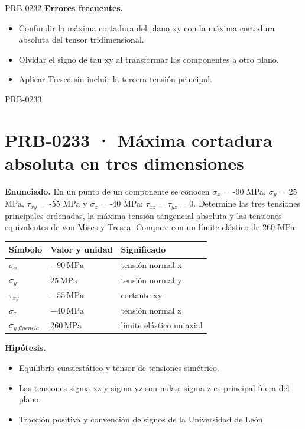 \begin{studiumworked}{PRB-0232}
\textbf{Errores frecuentes.}\begin{itemize}\item Confundir la máxima cortadura del plano xy con la máxima cortadura absoluta del tensor tridimensional.
\item Olvidar el signo de tau xy al transformar las componentes a otro plano.
\item Aplicar Tresca sin incluir la tercera tensión principal.\end{itemize}

\end{studiumworked}

\Needspace{.3\textheight}

\begin{studiumworked}{PRB-0233}

\section{PRB-0233 · Máxima cortadura absoluta en tres dimensiones}

\textbf{Enunciado.} En un punto de un componente se conocen $\sigma_x$ = -90 MPa, $\sigma_y$ = 25 MPa, $\tau_{xy}$ = -55 MPa y $\sigma_z$ = -40 MPa; $\tau_{xz}$ = $\tau_{yz}$ = 0. Determine las tres tensiones principales ordenadas, la máxima tensión tangencial absoluta y las tensiones equivalentes de von Mises y Tresca. Compare con un límite elástico de 260 MPa.

\par\medskip\noindent\begin{tabular}{@{}p{.18\linewidth}p{.26\linewidth}p{.48\linewidth}@{}}
\toprule Símbolo & Valor y unidad & Significado\\\midrule
$\sigma_{x}$ & $-90\,\mathrm{MPa}$ & tensión normal x\\
$\sigma_{y}$ & $25\,\mathrm{MPa}$ & tensión normal y\\
$\tau_{xy}$ & $-55\,\mathrm{MPa}$ & cortante xy\\
$\sigma_{z}$ & $-40\,\mathrm{MPa}$ & tensión normal z\\
$\sigma_{y\,fluencia}$ & $260\,\mathrm{MPa}$ & límite elástico uniaxial\\
\bottomrule\end{tabular}\par\medskip

\textbf{Hipótesis.}\begin{itemize}\item Equilibrio cuasiestático y tensor de tensiones simétrico.
\item Las tensiones sigma xz y sigma yz son nulas; sigma z es principal fuera del plano.
\item Tracción positiva y convención de signos de la Universidad de León.\end{itemize}


\end{studiumworked}
